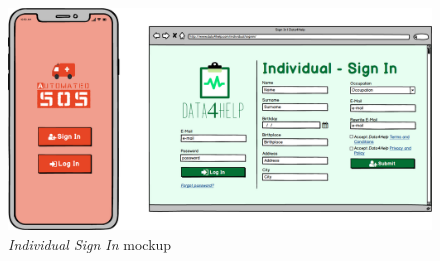 \begin{figure}[H]
\begin{center}
  \includegraphics[width=\textwidth]{img/mockup/Individual_SingIn.png}
  \hspace{0.05\linewidth}
  \centering
  \caption{\textit{Individual Sign In} mockup}
  \label{img:individualSignInMockup}
\end{center}
\end{figure}
